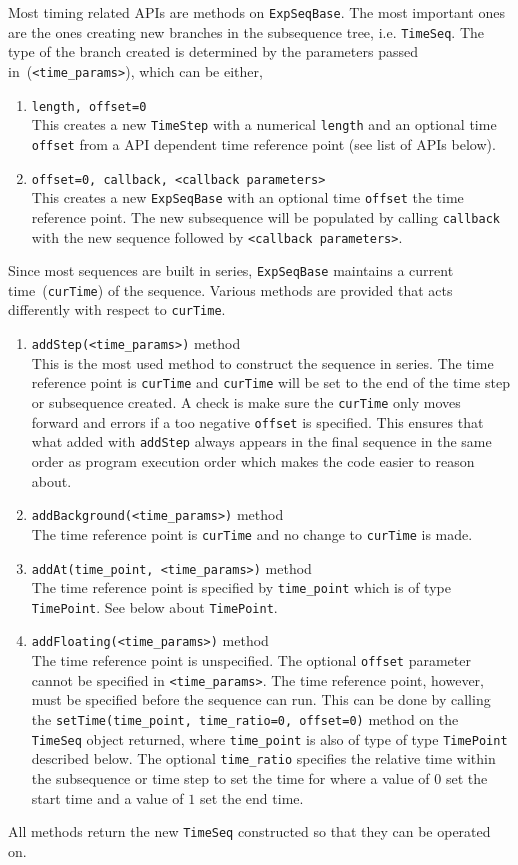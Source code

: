 Most timing related APIs are methods on \verb`ExpSeqBase`.
The most important ones are the ones creating new branches
in the subsequence tree, i.e. \verb`TimeSeq`.
The type of the branch created is determined by the parameters passed in~(\verb`<time_params>`),
which can be either,
\begin{enumerate}
\item \verb`length, offset=0`\\
  This creates a new \verb`TimeStep` with a numerical \verb`length`
  and an optional time \verb`offset` from a API dependent time reference point
  (see list of APIs below).
\item \verb`offset=0, callback, <callback parameters>`\\
  This creates a new \verb`ExpSeqBase` with an optional time \verb`offset`
  the time reference point.
  The new subsequence will be populated by calling \verb`callback`
  with the new sequence followed by \verb`<callback parameters>`.
\end{enumerate}
Since most sequences are built in series, \verb`ExpSeqBase` maintains
a current time~(\verb`curTime`) of the sequence.
Various methods are provided that acts differently with respect to \verb`curTime`.
\begin{enumerate}
\item \verb`addStep(<time_params>)` method\\
  This is the most used method to construct the sequence in series.
  The time reference point is \verb`curTime` and
  \verb`curTime` will be set to the end of the time step or subsequence created.
  A check is make sure the \verb`curTime` only moves forward and
  errors if a too negative \verb`offset` is specified.
  This ensures that what added with \verb`addStep` always appears in the final
  sequence in the same order as program execution order
  which makes the code easier to reason about.
\item \verb`addBackground(<time_params>)` method\\
  The time reference point is \verb`curTime` and no change to \verb`curTime` is made.
\item \verb`addAt(time_point, <time_params>)` method\\
  The time reference point is specified by \verb`time_point` which is of type \verb`TimePoint`.
  See below about \verb`TimePoint`.
\item \verb`addFloating(<time_params>)` method\\
  The time reference point is unspecified.
  The optional \verb`offset` parameter cannot be specified in \verb`<time_params>`.
  The time reference point, however, must be specified before the sequence can run.
  This can be done by calling the \verb`setTime(time_point, time_ratio=0, offset=0)` method
  on the \verb`TimeSeq` object returned,
  where \verb`time_point` is also of type of type \verb`TimePoint` described below.
  The optional \verb`time_ratio` specifies the relative time within the subsequence
  or time step to set the time for where a value of $0$ set the start time
  and a value of $1$ set the end time.
\end{enumerate}
All methods return the new \verb`TimeSeq` constructed so that they can be operated on.

